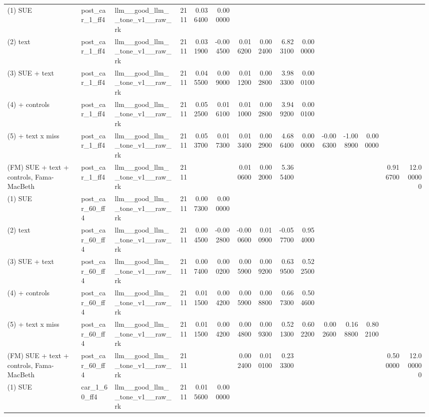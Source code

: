 \begin{table}
\begin{tabular}{lllrrrrrrrrrrrr}
(1) SUE & post\_car\_1\_ff4 & llm\_\_good\_llm\_\_tone\_v1\_\_raw\_rk & 2111 & 0.036400 & 0.000000 &  &  &  &  &  &  &  &  &  \\
(2) text & post\_car\_1\_ff4 & llm\_\_good\_llm\_\_tone\_v1\_\_raw\_rk & 2111 & 0.031900 & -0.004500 & 0.016200 & 0.002400 & 6.823100 & 0.000000 &  &  &  &  &  \\
(3) SUE + text & post\_car\_1\_ff4 & llm\_\_good\_llm\_\_tone\_v1\_\_raw\_rk & 2111 & 0.045500 & 0.009000 & 0.011200 & 0.002800 & 3.983300 & 0.000100 &  &  &  &  &  \\
(4) + controls & post\_car\_1\_ff4 & llm\_\_good\_llm\_\_tone\_v1\_\_raw\_rk & 2111 & 0.052500 & 0.016100 & 0.011000 & 0.002800 & 3.949200 & 0.000100 &  &  &  &  &  \\
(5) + text x miss & post\_car\_1\_ff4 & llm\_\_good\_llm\_\_tone\_v1\_\_raw\_rk & 2111 & 0.053700 & 0.017300 & 0.013400 & 0.002900 & 4.686400 & 0.000000 & -0.006300 & -1.008900 & 0.000000 &  &  \\
(FM) SUE + text + controls, Fama-MacBeth & post\_car\_1\_ff4 & llm\_\_good\_llm\_\_tone\_v1\_\_raw\_rk & 2111 &  &  & 0.010600 & 0.002000 & 5.365400 &  &  &  &  & 0.916700 & 12.000000 \\
(1) SUE & post\_car\_60\_ff4 & llm\_\_good\_llm\_\_tone\_v1\_\_raw\_rk & 2111 & 0.007300 & 0.000000 &  &  &  &  &  &  &  &  &  \\
(2) text & post\_car\_60\_ff4 & llm\_\_good\_llm\_\_tone\_v1\_\_raw\_rk & 2111 & 0.004500 & -0.002800 & -0.000600 & 0.010900 & -0.057700 & 0.954000 &  &  &  &  &  \\
(3) SUE + text & post\_car\_60\_ff4 & llm\_\_good\_llm\_\_tone\_v1\_\_raw\_rk & 2111 & 0.007400 & 0.000200 & 0.005900 & 0.009200 & 0.639500 & 0.522500 &  &  &  &  &  \\
(4) + controls & post\_car\_60\_ff4 & llm\_\_good\_llm\_\_tone\_v1\_\_raw\_rk & 2111 & 0.011500 & 0.004200 & 0.005900 & 0.008800 & 0.667300 & 0.504600 &  &  &  &  &  \\
(5) + text x miss & post\_car\_60\_ff4 & llm\_\_good\_llm\_\_tone\_v1\_\_raw\_rk & 2111 & 0.011500 & 0.004200 & 0.004800 & 0.009300 & 0.521300 & 0.602200 & 0.002600 & 0.168800 & 0.802100 &  &  \\
(FM) SUE + text + controls, Fama-MacBeth & post\_car\_60\_ff4 & llm\_\_good\_llm\_\_tone\_v1\_\_raw\_rk & 2111 &  &  & 0.002400 & 0.010100 & 0.233300 &  &  &  &  & 0.500000 & 12.000000 \\
(1) SUE & car\_1\_60\_ff4 & llm\_\_good\_llm\_\_tone\_v1\_\_raw\_rk & 2111 & 0.015600 & 0.000000 &  &  &  &  &  &  &  &  &  \\

\end{tabular}
\end{table}
